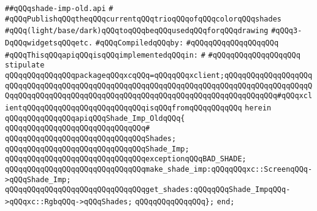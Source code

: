 \label{src/lib/x-kit/widget/old/lib/shade-imp-old.api}
\verb|##qQQqshade-imp-old.api|\newline
\verb|#|\newline
\verb|#qQQqPublishqQQqtheqQQqcurrentqQQqtrioqQQqofqQQqcolorqQQqshades|\newline
\verb|#qQQq(light/base/dark)qQQqtoqQQqbeqQQqusedqQQqforqQQqdrawing|\newline
\verb|#qQQq3-DqQQqwidgetsqQQqetc.|\newline
\newline
\verb|#qQQqCompiledqQQqby:|\newline
\verb|#qQQqqQQqqQQqqQQqqQQq|\newline
\newline
\newline
\verb|#qQQqThisqQQqapiqQQqisqQQqimplementedqQQqin:|\newline
\verb|#|\newline
\verb|#qQQqqQQqqQQqqQQqqQQq|\newline
\newline
\verb|stipulate|\newline
\verb|qQQqqQQqqQQqqQQqpackageqQQqxcqQQq=qQQqqQQqxclient;qQQqqQQqqQQqqQQqqQQqqQQqqQQqqQQqqQQqqQQqqQQqqQQqqQQqqQQqqQQqqQQqqQQqqQQqqQQqqQQqqQQqqQQqqQQqqQQqqQQqqQQqqQQqqQQqqQQqqQQqqQQqqQQqqQQqqQQqqQQqqQQqqQQqqQQq#qQQqxclientqQQqqQQqqQQqqQQqqQQqqQQqqQQqisqQQqfromqQQqqQQqqQQq|\newline
\verb|herein|\newline
\newline
\verb|qQQqqQQqqQQqqQQqapiqQQqShade_Imp_OldqQQq{|\newline
\verb|qQQqqQQqqQQqqQQqqQQqqQQqqQQqqQQq#|\newline
\verb|qQQqqQQqqQQqqQQqqQQqqQQqqQQqqQQqShades;|\newline
\verb|qQQqqQQqqQQqqQQqqQQqqQQqqQQqqQQqShade_Imp;|\newline
\newline
\verb|qQQqqQQqqQQqqQQqqQQqqQQqqQQqqQQqexceptionqQQqBAD_SHADE;|\newline
\newline
\verb|qQQqqQQqqQQqqQQqqQQqqQQqqQQqqQQqmake_shade_imp:qQQqqQQqxc::ScreenqQQq->qQQqShade_Imp;|\newline
\newline
\verb|qQQqqQQqqQQqqQQqqQQqqQQqqQQqqQQqget_shades:qQQqqQQqShade_ImpqQQq->qQQqxc::RgbqQQq->qQQqShades;|\newline
\verb|qQQqqQQqqQQqqQQq};|\newline
\newline
\verb|end;|\newline
\newline

